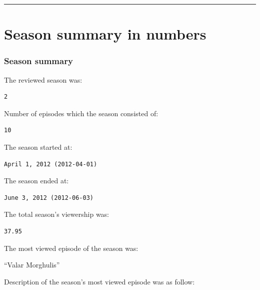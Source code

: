 \documentclass[
  letterpaper,
  DIV=11,
  numbers=noendperiod]{scrartcl}
\begin{document}
\begin{center}\rule{0.5\linewidth}{0.5pt}\end{center}

\hypertarget{season-summary-in-numbers}{%
\section{Season summary in numbers}\label{season-summary-in-numbers}}

\hypertarget{season-summary}{%
\subsubsection{Season summary}\label{season-summary}}

The reviewed season was:

\begin{verbatim}
2
\end{verbatim}

Number of episodes which the season consisted of:

\begin{verbatim}
10
\end{verbatim}

The season started at:

\begin{verbatim}
April 1, 2012 (2012-04-01)
\end{verbatim}

The season ended at:

\begin{verbatim}
June 3, 2012 (2012-06-03)
\end{verbatim}

The total season's viewership was:

\begin{verbatim}
37.95
\end{verbatim}

The most viewed episode of the season was:

``Valar Morghulis''

Description of the season's most viewed episode was as follow:
\end{document}
